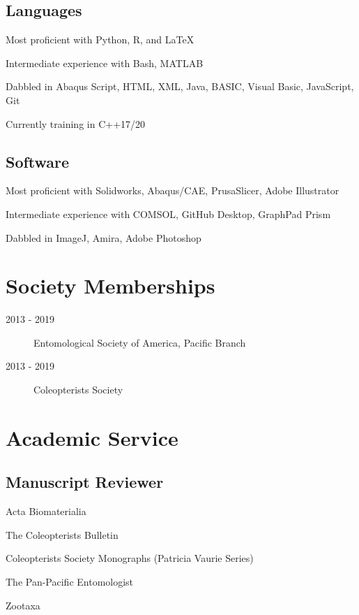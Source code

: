 \documentclass[12pt,a4paper]{article}
\begin{document}
	\subsection*{Languages}
		\begin{description}
			\item Most proficient with Python, R, and \LaTeX
			\item Intermediate experience with Bash, MATLAB
			\item Dabbled in Abaqus Script, HTML, XML, Java, BASIC, Visual Basic, JavaScript, Git
			\item Currently training in C++17/20
		\end{description}
		
	\subsection*{Software}
		\begin{description}
			\item Most proficient with Solidworks, Abaqus/CAE, PrusaSlicer, Adobe Illustrator
			\item Intermediate experience with COMSOL, GitHub Desktop, GraphPad Prism
			\item Dabbled in ImageJ, Amira, Adobe Photoshop
		\end{description}


\section*{Society Memberships}
	\begin{description}
		\item [2013 - 2019] Entomological Society of America, Pacific Branch
		\item [2013 - 2019] Coleopterists Society
	\end{description}

\section*{Academic Service}
	\subsection*{Manuscript Reviewer}
		\begin{description}
			\item Acta Biomaterialia
			\item The Coleopterists Bulletin
			\item Coleopterists Society Monographs (Patricia Vaurie Series)
			\item The Pan-Pacific Entomologist 
			\item Zootaxa
		\end{description}
\end{document}

